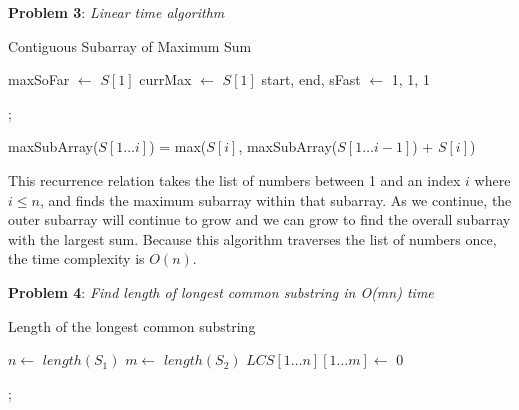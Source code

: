 \documentclass{article} %
\newcommand{\question}[2][]{\begin{flushleft}
        \textbf{Problem #1}: \textit{#2}

\end{flushleft}}
\begin{document}
    \newpage

    \question[3]{Linear time algorithm}
    
    \begin{algorithm}[H]
        \SetAlgoLined
        \caption{Contiguous Subarray of Maximum Sum}

        maxSoFar $\gets$ $S[1]$\;
        currMax $\gets$ $S[1]$\;
        start, end, sFast $\gets$ 1, 1, 1\;

        ;
    \end{algorithm}

    maxSubArray($S[1 \dots i]$) = max($S[i]$, maxSubArray($S[1 \dots i - 1]$) + $S[i]$)

    This recurrence relation takes the list of numbers between 1 and an index $i$ where $i \leq n$, and finds the maximum subarray within that subarray. As we continue, the outer subarray will continue to grow and we can grow to find the overall subarray with the largest sum. Because this algorithm traverses the list of numbers once, the time complexity is $O(n)$.

    \newpage

    \question[4]{Find length of longest common substring in O(mn) time}

    \begin{algorithm}
        \caption{Length of the longest common substring}

        $n \gets$ $length(S_1)$\;
        $m \gets$ $length(S_2)$\;
        $LCS[1 \dots n][1 \dots m] \gets$ 0\;

        ;
    \end{algorithm}
\end{document}
